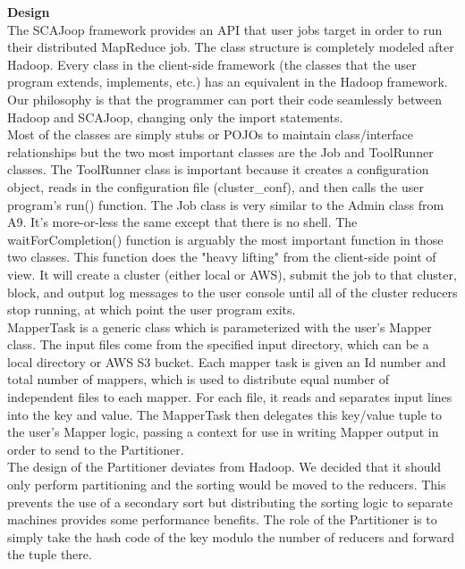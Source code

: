 \documentclass{article}
\begin{document}
\textbf{Design} \\
The SCAJoop framework provides an API that user jobs target in order to run their distributed MapReduce job. The class structure is completely modeled after Hadoop. Every class in the client-side framework (the classes that the user program extends, implements, etc.) has an equivalent in the Hadoop framework. Our philosophy is that the programmer can port their code seamlessly between Hadoop and SCAJoop, changing only the import statements.\\ Most of the classes are simply stubs or POJOs to maintain class/interface relationships but the two most important classes are the Job and ToolRunner classes. The ToolRunner class is important because it creates a configuration object, reads in the configuration file (cluster\_conf), and then calls the user program's run() function. The Job class is very similar to the Admin class from A9. It's more-or-less the same except that there is no shell. The waitForCompletion() function is arguably the most important function in those two classes. This function does the "heavy lifting" from the client-side point of view. It will create a cluster (either local or AWS), submit the job to that cluster, block, and output log messages to the user console until all of the cluster reducers stop running, at which point the user program exits. \\
MapperTask is a generic class which is parameterized with the user’s Mapper class. The input files come from the specified input directory, which can be a local directory or AWS S3 bucket. Each mapper task is given an Id number and total number of mappers, which is used to distribute equal number of independent files to each mapper. For each file, it reads and separates input lines into the key and value. The MapperTask then delegates this key/value tuple to the user’s Mapper logic, passing a context for use in writing Mapper output in order to send to the Partitioner.\\
The design of the Partitioner deviates from Hadoop. We decided that it should only perform partitioning and the sorting would be moved to the reducers. This prevents the use of a secondary sort but distributing the sorting logic to separate machines provides some performance benefits. The role of the Partitioner is to simply take the hash code of the key modulo the number of reducers and forward the tuple there. \\
\end{document}
